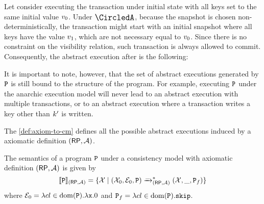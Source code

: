 
Let consider executing the transaction under initial state with all keys set to the same initial value \( v_0 \).
Under $\anarchicCM$, because the snapshot is chosen non-deterministically, 
the transaction might start with an initial snapshot where all keys have the value \( v_1 \),
which are not necessary equal to \( v_0 \).
Since there is no constraint on the visibility relation,
such transaction is always allowed to commit.
Consequently, the abstract execution after is the following: 
\begin{center}
\end{center}

It is important to note, however, that the set of abstract executions generated by $\mathtt{P}$ 
is still bound to the structure of the program.
For example, executing $\mathtt{P}$ under the anarchic execution model will never lead to 
an abstract execution with multiple transactions, 
or to an abstract execution where a transaction writes a key other than $k'$ is written.

The \cref{def:axiom-to-cm} defines all the possible abstract executions 
induced by a axiomatic definition $(\mathsf{RP}, \mathcal{A})$.

\begin{definition}
\label{def:axiom-to-cm}
\label{def:axiom-to-prog}
The semantics of a program $\mathtt{P}$ under a consistency model with axiomatic definition 
$(\mathsf{RP}, \mathcal{A})$ is given by 
\[
\llbracket \mathtt{P} \rrbracket_{(\mathsf{RP}, \mathcal{A})} = \{ \mathcal{X} \mid (\mathcal{X}_{0}, \mathcal E_{0}, \mathtt{P}) \xrightarrow{\_}_{(\mathsf{RP}, \mathcal{A})}^{\ast} (\mathcal{X}, \_, \mathtt{P}_{f}) \}
\]
where $\mathcal E_{0} = \lambda {\ensuremath{cl}} \in \operatorname{dom}(\mathtt{P}).\lambda \mathtt{x}.0$ and $\mathtt{P}_{f} = \lambda {\ensuremath{cl}} \in \operatorname{dom}(\mathtt{P}).\mathtt{skip}$.
\end{definition}

